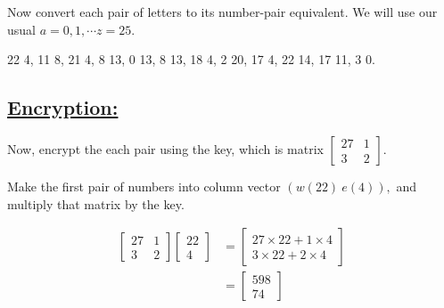 \documentclass[a4paper,12pt]{article}
\begin{document}
    Now convert each pair of letters to its number-pair equivalent. We will use our usual $a=0,1,\cdots z=25$.
    \vspace*{0.3cm}

    22 4,   11 8,   21 4,   8 13,   0 13,   8 13,   18 4,   2 20,   17 4,   22 14,   17 11,   3 0.

    \vspace*{0.3cm}

    \subsection*{\underline{Encryption:}}

    Now, encrypt the each pair using the key, which is matrix $\begin{bmatrix}
        27 & 1 \\
        3 & 2
    \end{bmatrix}.$

    \vspace*{0.3cm}

    Make the first pair of numbers into column vector $\left(w(22)\ e(4)\right),$ and multiply that matrix by the key.

    \begin{center}
        \begin{equation*}
            \begin{split}
                \begin{bmatrix}
                    27 & 1 \\
                    3 & 2
                \end{bmatrix}
                \begin{bmatrix}
                    22 \\
                    4
                \end{bmatrix} & = \begin{bmatrix}
                    27\times 22 + 1\times 4 \\
                    3\times 22 + 2\times 4
                \end{bmatrix}\\  & = \begin{bmatrix}
                    598 \\
                    74
                \end{bmatrix}    
            \end{split}
        \end{equation*}
    \end{center}
\end{document}

